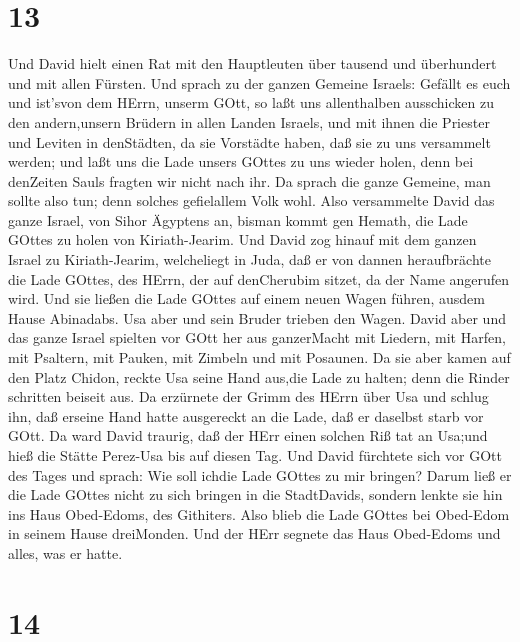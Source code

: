 \hypertarget{section-12}{%
\section{13}\label{section-12}}

 Und David hielt einen Rat mit den Hauptleuten über tausend
und überhundert und mit allen Fürsten.  Und sprach zu der
ganzen Gemeine Israels: Gefällt es euch und ist'svon dem HErrn, unserm
GOtt, so laßt uns allenthalben ausschicken zu den andern,unsern Brüdern
in allen Landen Israels, und mit ihnen die Priester und Leviten in
denStädten, da sie Vorstädte haben, daß sie zu uns versammelt werden;
 und laßt uns die Lade unsers GOttes zu uns wieder holen,
denn bei denZeiten Sauls fragten wir nicht nach ihr.  Da
sprach die ganze Gemeine, man sollte also tun; denn solches gefielallem
Volk wohl.  Also versammelte David das ganze Israel, von
Sihor Ägyptens an, bisman kommt gen Hemath, die Lade GOttes zu holen von
Kiriath-Jearim.  Und David zog hinauf mit dem ganzen Israel
zu Kiriath-Jearim, welcheliegt in Juda, daß er von dannen heraufbrächte
die Lade GOttes, des HErrn, der auf denCherubim sitzet, da der Name
angerufen wird.  Und sie ließen die Lade GOttes auf einem
neuen Wagen führen, ausdem Hause Abinadabs. Usa aber und sein Bruder
trieben den Wagen.  David aber und das ganze Israel spielten
vor GOtt her aus ganzerMacht mit Liedern, mit Harfen, mit Psaltern, mit
Pauken, mit Zimbeln und mit Posaunen.  Da sie aber kamen auf
den Platz Chidon, reckte Usa seine Hand aus,die Lade zu halten; denn die
Rinder schritten beiseit aus.  Da erzürnete der Grimm des
HErrn über Usa und schlug ihn, daß erseine Hand hatte ausgereckt an die
Lade, daß er daselbst starb vor GOtt.  Da ward David
traurig, daß der HErr einen solchen Riß tat an Usa;und hieß die Stätte
Perez-Usa bis auf diesen Tag.  Und David fürchtete sich vor
GOtt des Tages und sprach: Wie soll ichdie Lade GOttes zu mir bringen?
 Darum ließ er die Lade GOttes nicht zu sich bringen in die
StadtDavids, sondern lenkte sie hin ins Haus Obed-Edoms, des Githiters.
 Also blieb die Lade GOttes bei Obed-Edom in seinem Hause
dreiMonden. Und der HErr segnete das Haus Obed-Edoms und alles, was er
hatte.

\hypertarget{section-13}{%
\section{14}\label{section-13}}

